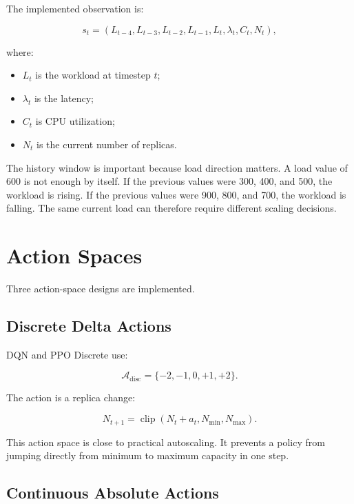 \documentclass{rapportINPTCLOUD}
\begin{document}
The implemented observation is:

\begin{equation}
s_t =
\left(
L_{t-4}, L_{t-3}, L_{t-2}, L_{t-1}, L_t,
\lambda_t,
C_t,
N_t
\right),
\label{eq:state}
\end{equation}

where:

\begin{itemize}
  \item $L_t$ is the workload at timestep $t$;
  \item $\lambda_t$ is the latency;
  \item $C_t$ is CPU utilization;
  \item $N_t$ is the current number of replicas.
\end{itemize}

The history window is important because load direction matters. A load value of 600 is not enough by itself. If the previous values were 300, 400, and 500, the workload is rising. If the previous values were 900, 800, and 700, the workload is falling. The same current load can therefore require different scaling decisions.

\section{Action Spaces}

Three action-space designs are implemented.

\subsection{Discrete Delta Actions}

DQN and PPO Discrete use:

\begin{equation}
\mathcal{A}_{\text{disc}} =
\{-2,-1,0,+1,+2\}.
\end{equation}

The action is a replica change:

\begin{equation}
N_{t+1}
=
\operatorname{clip}
\left(
N_t + a_t,
N_{\min},
N_{\max}
\right).
\end{equation}

This action space is close to practical autoscaling. It prevents a policy from jumping directly from minimum to maximum capacity in one step.

\subsection{Continuous Absolute Actions}
\end{document}
